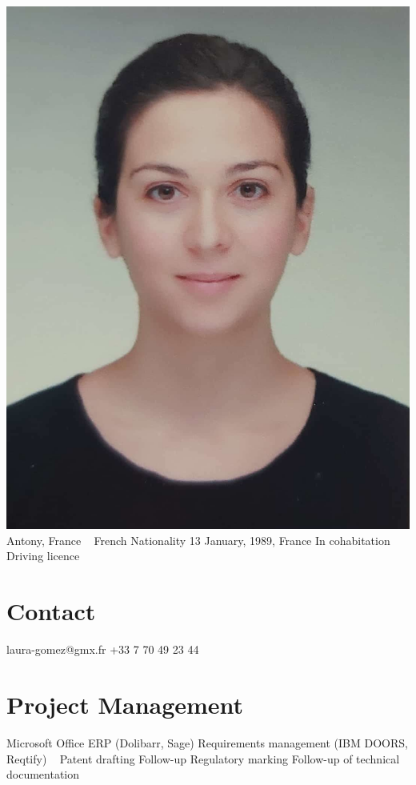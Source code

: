 \documentclass{cv-style}     %
\begin{document}


\begin{aside}
    \includegraphics[width=.8\columnwidth]{img/LG}
    Antony, France
    ~
    French Nationality
    13 January, 1989, France
    In cohabitation
    Driving licence
    \section{Contact}
    laura-gomez@gmx.fr
    +33 7 70 49 23 44    
    \section{Project Management}
    Microsoft Office
    ERP (Dolibarr, Sage)
    Requirements management (IBM DOORS, Reqtify)
    ~
    Patent drafting
    Follow-up Regulatory marking
    Follow-up of technical documentation

\end{aside}
\end{document}
